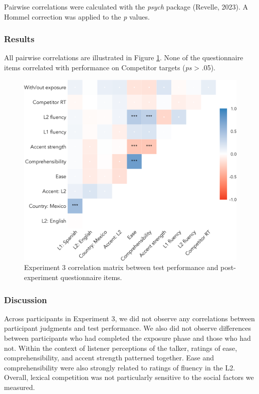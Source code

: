 \documentclass[
  12pt,
  twoside]{article}
\begin{document}
Pairwise correlations were calculated with the \emph{psych} package (Revelle, 2023).
A Hommel correction was applied to the \emph{p} values.

\hypertarget{results-3}{%
\subsubsection{Results}\label{results-3}}

All pairwise correlations are illustrated in Figure \ref{fig:exp3-corr-fig}.
None of the questionnaire items correlated with performance on Competitor targets (\emph{ps} \textgreater{} .05).

\begin{figure}[H]

{\centering \includegraphics[width=\textwidth]{sections/code/outputs/corr_plot_1} 

}

\caption{Experiment 3 correlation matrix between test performance and post-experiment questionnaire items.}\label{fig:exp3-corr-fig}
\end{figure}

\hypertarget{discussion-2}{%
\subsubsection{Discussion}\label{discussion-2}}

Across participants in Experiment 3, we did not observe any correlations between participant judgments and test performance.
We also did not observe differences between participants who had completed the exposure phase and those who had not.
Within the context of listener perceptions of the talker, ratings of ease, comprehensibility, and accent strength patterned together.
Ease and comprehensibility were also strongly related to ratings of fluency in the L2.
Overall, lexical competition was not particularly sensitive to the social factors we measured.
\end{document}
